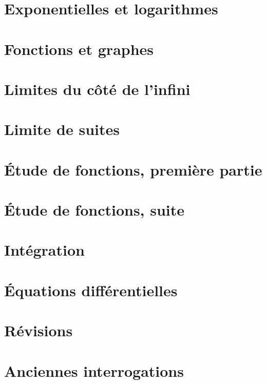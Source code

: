 \section{Exponentielles et logarithmes}



\section{Fonctions et graphes}



\section{Limites du côté de l'infini}


\section{Limite de suites}



\section{Étude de fonctions, première partie}


\section{Étude de fonctions, suite}


\section{Intégration}


\newpage

\section{Équations différentielles}


\section{Révisions}


\section{Anciennes interrogations}




